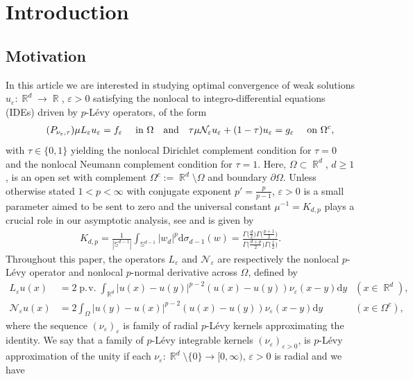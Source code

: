 \documentclass[12pt, reqno]{amsart}%
\theoremstyle{plain}  %
\theoremstyle{definition}  %
\numberwithin{equation}{section}
\DeclareMathOperator{\pv}{\operatorname{p.\!v.}}
\DeclareMathOperator{\R}{\mathbb{R}}
\renewcommand{\d}{\mathrm{d}}
\newcommand{\eps}{\varepsilon}
\begin{document}
\tableofcontents
\vspace{-1cm}
\section{Introduction}\label{sec:intro}
\subsection{Motivation} In this article we are interested in studying optimal convergence of weak solutions $u_\eps: \R^d\to \R$, $\eps > 0$  satisfying the nonlocal to integro-differential equations (IDEs) driven by $p$-L\'evy operators, of the form
\begin{align}\label{eq:main-problem-nonlocal}
\tag{$P_{\nu_\eps,\tau}$}
\mu L_\eps u_\eps = f_\eps \quad \text{ in } \Omega
\quad \text{and} \quad
\tau \mu \mathcal{N}_\eps u_\eps + (1-\tau) u_\eps = g_\eps
\quad \text{ on } \Omega^c ,
\end{align}
with $\tau \in \{0,1\}$ yielding the nonlocal Dirichlet complement  condition for $\tau = 0$ and the nonlocal Neumann complement condition for $\tau = 1$. Here, $\Omega \subset \R^d$, $d \ge 1$, is an open set with complement $\Omega^c := \R^d \setminus \Omega$ and boundary $\partial\Omega$. Unless otherwise stated $1 < p < \infty$ with conjugate exponent $p' = \frac{p}{p-1}$, $\eps > 0$ is a small parameter aimed to be sent to zero and  the universal constant $\mu^{-1}=K_{d,p}$ plays a crucial role in our asymptotic analysis, see \cite{guy-thesis, Fog23} and is given by
\begin{align*}
K_{d,p}= \frac{1}{|\mathbb{S}^{d-1}|}\int_{\mathbb{S}^{d-1}} |w_d|^p\d \sigma_{d-1}(w)= \frac{ \Gamma\big(\frac{d}{2}\big)  \Gamma\big(\frac{p+1}{2}\big)}{\Gamma\big(\frac{d+p}{2}\big) \Gamma\big(\frac{1}{2}\big)}.
\end{align*}
Throughout this paper, the operators $L_\eps$ and $\mathcal{N}_\eps$ are respectively the nonlocal $p$-L\'evy operator and nonlocal $p$-normal derivative across $\Omega$, defined by
\begin{align*}
L_\eps u(x)&=2\pv \int_{\R^d} |u(x)-u(y)|^{p-2}(u(x)-u(y)) \nu_\eps(x-y)\d y
&&(x\in \R^d),\\
\mathcal{N}_\eps u(x)&=2 \int_{\Omega}
|u(y)-u(x)|^{p-2}(u(x)-u(y)) \nu_\eps(x-y)\d y
&&(x\in \Omega^c),
\end{align*}
where the sequence $(\nu_\eps)_\eps$ is family of radial $p$-L\'evy kernels approximating the identity. We say that a family of   $p$-L\'evy integrable kernels $(\nu_\eps)_{\eps>0}$, is $p$-L\'evy approximation of the unity if  each $\nu_\eps : \R^d\setminus\{0\}\to [0,\infty)$, $\eps>0$ is radial and we have
\end{document}
